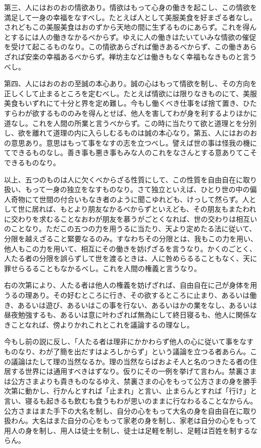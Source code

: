 \documentclass[a4paper, platex, dvipdfmx]{jsarticle}
\begin{document}
第三、人にはおのおの情欲あり。情欲はもって心身の働きを起こし、この情欲を満足して一身の幸福をなすべし。たとえば人として美服美食を好まざる者なし。されどもこの美服美食はおのずから天地の間に生ずるものにあらず。これを得んとするには人の働きなかるべからず。ゆえに人の働きはたいていみな情欲の催促を受けて起こるものなり。この情欲あらざれば働きあるべからず、この働きあらざれば安楽の幸福あるべからず。禅坊主などは働きもなく幸福もなきものと言うべし。

第四、人にはおのおの至誠の本心あり。誠の心はもって情欲を制し、その方向を正しくして止まるところを定むべし。たとえば情欲には限りなきものにて、美服美食もいずれにて十分と界を定め難し。今もし働くべき仕事をば捨て置き、ひたすらわが欲するもののみを得んとせば、他人を害してわが身を利するよりほかに道なし。これを人間の所業と言うべからず。この時に当たりて欲と道理とを分別し、欲を離れて道理の内に入らしむるものは誠の本心なり。第五、人にはおのおの意思あり。意思はもって事をなすの志を立つべし。譬えば世の事は怪我の機にてできるものなし。善き事も悪き事もみな人のこれをなさんとする意ありてこそできるものなり。

以上、五つのものは人に欠くべからざる性質にして、この性質を自由自在に取り扱い、もって一身の独立をなすものなり。さて独立といえば、ひとり世の中の偏人奇物にて世間の付合いもなき者のように聞こゆれども、けっして然らず。人として世に居れば、もとより朋友なかるべからずといえども、その朋友もまたわれに交わりを求むることなおわが朋友を慕うがごとくなれば、世の交わりは相互いのことなり。ただこの五つの力を用うるに当たり、天より定めたる法に従いて、分限を越えざること緊要なるのみ。すなわちその分限とは、我もこの力を用い、他人もこの力を用いて、相互にその働きを妨げざるを言うなり。かくのごとく、人たる者の分限を誤らずして世を渡るときは、人に咎めらるることもなく、天に罪せらるることもなかるべし。これを人間の権義と言うなり。

右の次第により、人たる者は他人の権義を妨げざれば、自由自在に己が身体を用うるの理あり。その好むところに行き、その欲するところに止まり、あるいは働き、あるいは遊び、あるいはこの事を行ない、あるいはかの業をなし、あるいは昼夜勉強するも、あるいは意に叶わざれば無為にして終日寝るも、他人に関係なきことなれば、傍よりかれこれとこれを議論するの理なし。

今もし前の説に反し、「人たる者は理非にかかわらず他人の心に従いて事をなすものなり、わが了簡を出だすはよろしからず」という議論を立つる者あらん。この議論はたして理の当然なるか。理の当然ならばおよそ人と名のつきたる者の住居する世界には通用すべきはずなり。仮りにその一例を挙げて言わん。禁裏さまは公方さまよりも貴きものなるゆえ、禁裏さまの心をもって公方さまの身を勝手次第に動かし、行かんとすれば「止まれ」と言い、止まらんとすれば「行け」と言い、寝るも起きるも飲むも食うもわが思いのままに行なわるることなからん。公方さまはまた手下の大名を制し、自分の心をもって大名の身を自由自在に取り扱わん。大名はまた自分の心をもって家老の身を制し、家老は自分の心をもって用人の身を制し、用人は徒士を制し、徒士は足軽を制し、足軽は百姓を制するならん。
\end{document}
